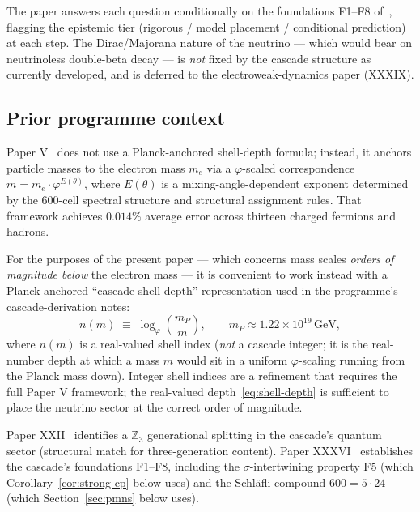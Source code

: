 \documentclass[12pt]{article}
\theoremstyle{definition}
\theoremstyle{remark}
\begin{document}
The paper answers each question conditionally on the foundations F1--F8 of~\citep{SmartXXXVI}, flagging the epistemic tier (rigorous / model placement / conditional prediction) at each step. The Dirac/Majorana nature of the neutrino --- which would bear on neutrinoless double-beta decay --- is \emph{not} fixed by the cascade structure as currently developed, and is deferred to the electroweak-dynamics paper (XXXIX).

\subsection{Prior programme context}

Paper V~\citep{SmartV} does not use a Planck-anchored shell-depth formula; instead, it anchors particle masses to the electron mass $m_e$ via a $\varphi$-scaled correspondence $m = m_e \cdot \varphi^{E(\theta)}$, where $E(\theta)$ is a mixing-angle-dependent exponent determined by the 600-cell spectral structure and structural assignment rules. That framework achieves $0.014\%$ average error across thirteen charged fermions and hadrons.

For the purposes of the present paper --- which concerns mass scales \emph{orders of magnitude below} the electron mass --- it is convenient to work instead with a Planck-anchored ``cascade shell-depth'' representation used in the programme's cascade-derivation notes:
\begin{equation}\label{eq:shell-depth}
n(m) \;\equiv\; \log_\varphi\!\left(\frac{m_P}{m}\right), \qquad m_P \approx 1.22 \times 10^{19}\,\mathrm{GeV},
\end{equation}
where $n(m)$ is a real-valued shell index (\emph{not} a cascade integer; it is the real-number depth at which a mass $m$ would sit in a uniform $\varphi$-scaling running from the Planck mass down). Integer shell indices are a refinement that requires the full Paper V framework; the real-valued depth~\eqref{eq:shell-depth} is sufficient to place the neutrino sector at the correct order of magnitude.

Paper XXII~\citep{SmartXXII} identifies a $\mathbb{Z}_3$ generational splitting in the cascade's quantum sector (structural match for three-generation content). Paper XXXVI~\citep{SmartXXXVI} establishes the cascade's foundations F1--F8, including the $\sigma$-intertwining property F5 (which Corollary~\ref{cor:strong-cp} below uses) and the Schl\"afli compound $600 = 5 \cdot 24$ (which Section~\ref{sec:pmns} below uses).
\end{document}

